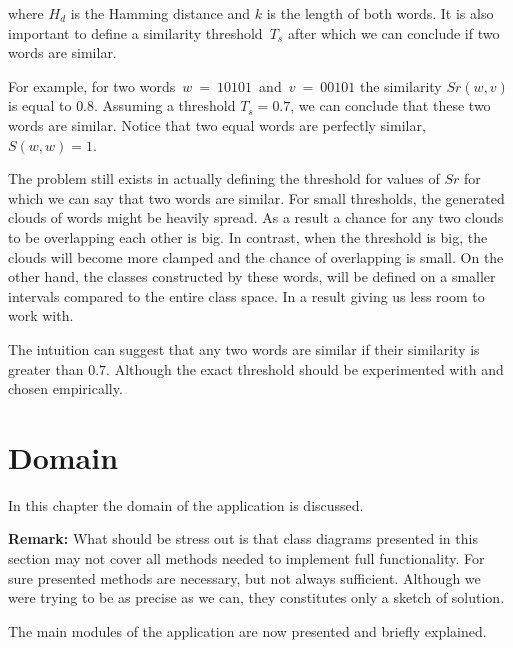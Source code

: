 \documentclass{mini}
\begin{document}
where $H_d$ is the Hamming distance and $k$ is the length of both words. It is also important to define a similarity threshold~$T_s$ after which we can conclude if two words are similar.

For example, for two words~$w~=~10101$~and~$v~=~00101$ the similarity $Sr(w, v)$ is equal to $0.8$. Assuming a threshold $T_s = 0.7$, we can conclude that these two words are similar. Notice that two equal words are perfectly similar, $S(w,w) = 1$.

The problem still exists in actually defining the threshold for values of $Sr$ for which we can say that two words are similar. For small thresholds, the generated clouds of words might be heavily spread. As a result a chance for any two clouds to be overlapping each other is big. In contrast, when the threshold is big, the clouds will become more clamped and the chance of overlapping is small. On the other hand, the classes constructed by these words, will be defined on a smaller intervals compared to the entire class space. In a result giving us less room to work with.

The intuition can suggest that any two words are similar if their similarity is greater than $0.7$. Although the exact threshold should be experimented with and chosen empirically.






\chapter{Domain} \label{sec:model}
In this chapter the domain of the application is discussed. 

\textbf{Remark:} What should be stress out is that class diagrams presented in this section may not cover all methods needed to implement full functionality. For sure presented methods are necessary, but not always sufficient. Although we were trying to be as precise as we can, they constitutes only a sketch of solution.

The main modules of the application are now presented and briefly explained.
\end{document}
